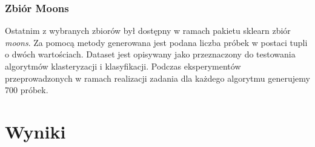 \documentclass{classrep}
\begin{document}
{{            \subsubsection{Zbiór Moons}
            \label{opis_zbiorow_intro_moons} {
                Ostatnim z wybranych zbiorów był dostępny w ramach pakietu sklearn zbiór \textit{moons}. Za pomocą metody generowana jest podana liczba próbek w postaci tupli o dwóch wartościach. Dataset jest opisywany jako przeznaczony do testowania algorytmów klasteryzacji i klasyfikacji. Podczas eksperymentów przeprowadzonych w ramach realizacji zadania dla każdego algorytmu generujemy 700 próbek.
            }

        }

    }
    \newpage

    \section{Wyniki}
\end{document}
